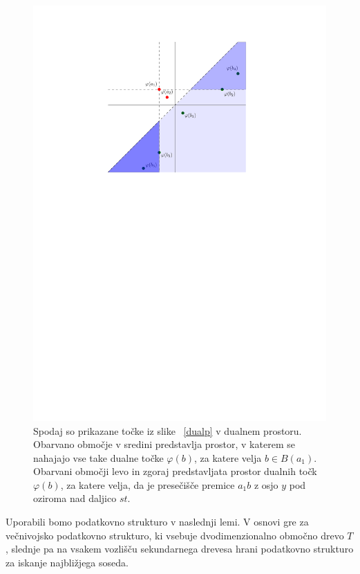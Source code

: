 \documentclass[a4paper, 12pt]{book}
\begin{document}
\begin{figure}
\centerline{\includegraphics[scale=1.2]{pics/dual_problem4.pdf}}
\caption{Spodaj so prikazane točke iz slike ~\ref{dualp} v dualnem prostoru. Obarvano območje v sredini predstavlja prostor, v katerem se nahajajo vse take dualne točke $\varphi (b)$, za katere velja $b \in B(a_1)$. Obarvani območji levo in zgoraj predstavljata prostor dualnih točk $\varphi (b)$, za katere velja, da je presečišče premice $a_1b$ z osjo $y$ pod oziroma nad daljico $st$.} 
\label{dualp2}
\end{figure}

Uporabili bomo podatkovno strukturo v naslednji lemi. V osnovi gre za večnivojsko podatkovno strukturo, ki vsebuje dvodimenzionalno območno drevo $T$, slednje pa na vsakem vozlišču sekundarnega drevesa hrani podatkovno strukturo za iskanje najbližjega soseda. 
\end{document}
